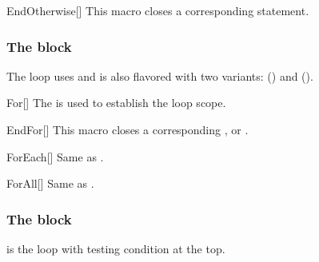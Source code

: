 \documentclass[a4paper, 11pt]{article}
\begin{document}
\begin{macro}{EndOtherwise}[]
    This macro closes a corresponding  statement.

    \MacroOptionsText
\end{macro}

\subsubsection{The  block}
The  loop uses  and is also flavored with two variants:  () and  ().

\begin{tcblisting}{}
    \begin{algorithmic}
        \EndFor
        \EndFor
        \EndFor
    \end{algorithmic}
\end{tcblisting}


\begin{macro}{For}[]
    The  is used to establish the loop scope.

    \BlockOptionsText
\end{macro}

\begin{macro}{EndFor}[]
    This macro closes a corresponding ,  or .

    \MacroOptionsText
\end{macro}

\begin{macro}{ForEach}[]
    Same as .
\end{macro}

\begin{macro}{ForAll}[]
    Same as .
\end{macro}

\subsubsection{The  block}
 is the loop with testing condition at the top.
\end{document}
